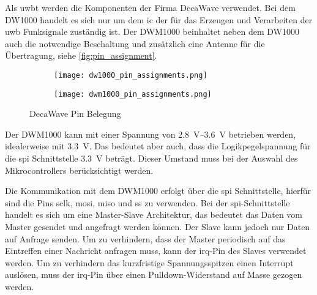 \subsubsection{}\label{subsec:uwb_transceiver}

Als \Gls{uwbt} werden die Komponenten der Firma DecaWave verwendet. Bei dem DW1000 handelt es sich nur um dem \Gls{ic} der für das Erzeugen und Verarbeiten der \gls{uwb} Funksignale zuständig ist. Der DWM1000 beinhaltet neben dem DW1000 auch die notwendige Beschaltung und zusätzlich eine Antenne für die Übertragung, siehe \autoref{fig:pin_assignment}.

\begin{figure}
	\begin{subfigure}[t]{0.4\textwidth}
		\texttt{[image: dw1000\_pin\_assignments.png]}
		\label{fig:dw1000_pin_assignments}
	\end{subfigure}
	\hfill
	\begin{subfigure}[t]{0.4\textwidth}
		\texttt{[image: dwm1000\_pin\_assignments.png]}
		\label{fig:dwm1000_pin_assignments}
	\end{subfigure}
	\caption{DecaWave  Pin Belegung}
	\label{fig:pin_assignment}
\end{figure}

Der DWM1000 kann mit einer Spannung von \SIrange{2.8}{3.6}{\volt} \cite{decawave2016dwm1kdatasheet} betrieben werden, idealerweise mit \SI{3.3}{\volt}. Das bedeutet aber auch, dass die Logikpegelspannung für die \gls{spi} Schnittstelle \SI{3.3}{\volt} beträgt. Dieser Umstand muss bei der Auswahl des Mikrocontrollers berücksichtigt werden.

Die Kommunikation mit dem DWM1000 erfolgt über die \gls{spi} Schnittstelle, hierfür sind die Pins \gls{sclk}, \gls{mosi}, \gls{miso} und \gls{ss} zu verwenden. \cite{decawave2016dwm1kdatasheet} Bei der \gls{spi}-Schnittstelle handelt es sich um eine Master-Slave Architektur, das bedeutet das Daten vom Master gesendet und angefragt werden können. Der Slave kann jedoch nur Daten auf Anfrage senden. Um zu verhindern, dass der Master periodisch auf das Eintreffen einer Nachricht anfragen muss, kann der \gls{irq}-Pin des Slaves verwendet werden. Um zu verhindern das kurzfristige Spannungsspitzen einen Interrupt auslösen, muss der \gls{irq}-Pin über einen Pulldown-Widerstand auf Masse gezogen werden.

